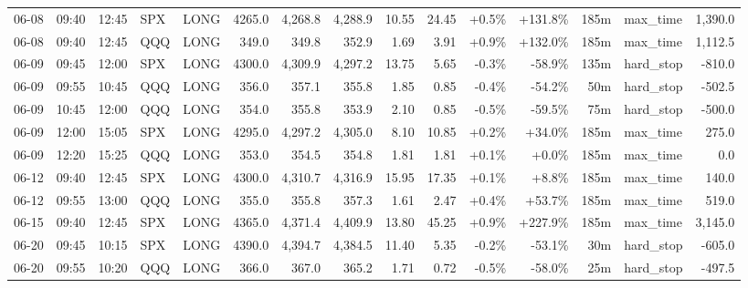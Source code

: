 \documentclass[11pt,a4paper,twoside]{article}
\begin{document}
\begin{landscape}
\begin{center}
\begin{longtable}{>{\color{txtmain}}l l l l l r r r r r r r r >{\color{txtmain}}l r}
06-08 & 09:40 & 12:45 & SPX & LONG & 4265.0 & 4,268.8 & 4,288.9 & 10.55 & 24.45 & \textcolor{wingreen}{+0.5\%} & \textcolor{wingreen}{+131.8\%} & 185m & max\_time & \textcolor{wingreen}{1,390.0} \\
06-08 & 09:40 & 12:45 & QQQ & LONG & 349.0 & 349.8 & 352.9 & 1.69 & 3.91 & \textcolor{wingreen}{+0.9\%} & \textcolor{wingreen}{+132.0\%} & 185m & max\_time & \textcolor{wingreen}{1,112.5} \\
06-09 & 09:45 & 12:00 & SPX & LONG & 4300.0 & 4,309.9 & 4,297.2 & 13.75 & 5.65 & \textcolor{lossred}{-0.3\%} & \textcolor{lossred}{-58.9\%} & 135m & hard\_stop & \textcolor{lossred}{-810.0} \\
06-09 & 09:55 & 10:45 & QQQ & LONG & 356.0 & 357.1 & 355.8 & 1.85 & 0.85 & \textcolor{lossred}{-0.4\%} & \textcolor{lossred}{-54.2\%} & 50m & hard\_stop & \textcolor{lossred}{-502.5} \\
06-09 & 10:45 & 12:00 & QQQ & LONG & 354.0 & 355.8 & 353.9 & 2.10 & 0.85 & \textcolor{lossred}{-0.5\%} & \textcolor{lossred}{-59.5\%} & 75m & hard\_stop & \textcolor{lossred}{-500.0} \\
06-09 & 12:00 & 15:05 & SPX & LONG & 4295.0 & 4,297.2 & 4,305.0 & 8.10 & 10.85 & \textcolor{wingreen}{+0.2\%} & \textcolor{wingreen}{+34.0\%} & 185m & max\_time & \textcolor{wingreen}{275.0} \\
06-09 & 12:20 & 15:25 & QQQ & LONG & 353.0 & 354.5 & 354.8 & 1.81 & 1.81 & \textcolor{wingreen}{+0.1\%} & \textcolor{wingreen}{+0.0\%} & 185m & max\_time & \textcolor{wingreen}{0.0} \\
06-12 & 09:40 & 12:45 & SPX & LONG & 4300.0 & 4,310.7 & 4,316.9 & 15.95 & 17.35 & \textcolor{wingreen}{+0.1\%} & \textcolor{wingreen}{+8.8\%} & 185m & max\_time & \textcolor{wingreen}{140.0} \\
06-12 & 09:55 & 13:00 & QQQ & LONG & 355.0 & 355.8 & 357.3 & 1.61 & 2.47 & \textcolor{wingreen}{+0.4\%} & \textcolor{wingreen}{+53.7\%} & 185m & max\_time & \textcolor{wingreen}{519.0} \\
06-15 & 09:40 & 12:45 & SPX & LONG & 4365.0 & 4,371.4 & 4,409.9 & 13.80 & 45.25 & \textcolor{wingreen}{+0.9\%} & \textcolor{wingreen}{+227.9\%} & 185m & max\_time & \textcolor{wingreen}{3,145.0} \\
06-20 & 09:45 & 10:15 & SPX & LONG & 4390.0 & 4,394.7 & 4,384.5 & 11.40 & 5.35 & \textcolor{lossred}{-0.2\%} & \textcolor{lossred}{-53.1\%} & 30m & hard\_stop & \textcolor{lossred}{-605.0} \\
06-20 & 09:55 & 10:20 & QQQ & LONG & 366.0 & 367.0 & 365.2 & 1.71 & 0.72 & \textcolor{lossred}{-0.5\%} & \textcolor{lossred}{-58.0\%} & 25m & hard\_stop & \textcolor{lossred}{-497.5} \\

\end{longtable}
\end{center}
\end{landscape}
\end{document}
